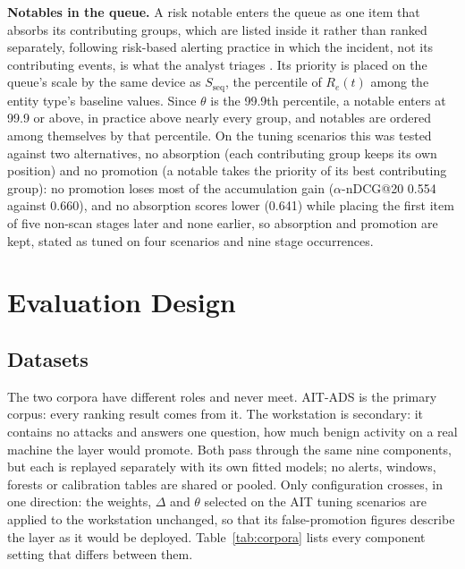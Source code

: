 \documentclass[conference]{IEEEtran}
\begin{document}
\textbf{Notables in the queue.} A risk notable enters the queue as one item that absorbs its contributing groups, which are listed inside it rather than ranked separately, following risk-based alerting practice in which the incident, not its contributing events, is what the analyst triages \cite{ref19}. Its priority is placed on the queue's scale by the same device as $S_\mathrm{seq}$, the percentile of $R_e(t)$ among the entity type's baseline values. Since $\theta$ is the 99.9th percentile, a notable enters at 99.9 or above, in practice above nearly every group, and notables are ordered among themselves by that percentile. On the tuning scenarios this was tested against two alternatives, no absorption (each contributing group keeps its own position) and no promotion (a notable takes the priority of its best contributing group): no promotion loses most of the accumulation gain ($\alpha$-nDCG@20 0.554 against 0.660), and no absorption scores lower (0.641) while placing the first item of five non-scan stages later and none earlier, so absorption and promotion are kept, stated as tuned on four scenarios and nine stage occurrences.

\section{Evaluation Design}
\label{sec:eval}

\subsection{Datasets}

The two corpora have different roles and never meet. AIT-ADS is the primary corpus: every ranking result comes from it. The workstation is secondary: it contains no attacks and answers one question, how much benign activity on a real machine the layer would promote. Both pass through the same nine components, but each is replayed separately with its own fitted models; no alerts, windows, forests or calibration tables are shared or pooled. Only configuration crosses, in one direction: the weights, $\Delta$ and $\theta$ selected on the AIT tuning scenarios are applied to the workstation unchanged, so that its false-promotion figures describe the layer as it would be deployed. Table~\ref{tab:corpora} lists every component setting that differs between them.
\end{document}
